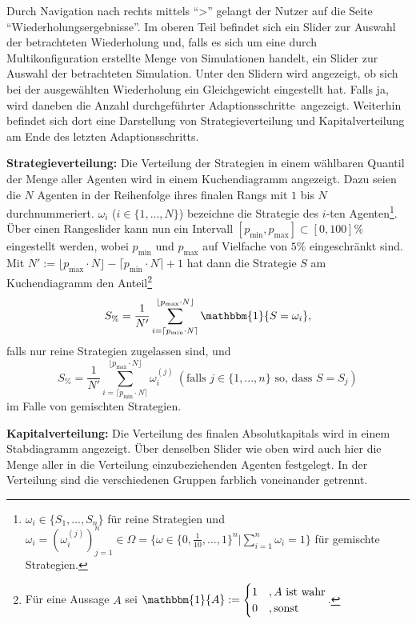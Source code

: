 \documentclass[parskip=full,11pt]{scrartcl}
\def\adapt{Adaptionsschritt}
\def\adapts{Adaptionsschritte}
\begin{document}
Durch Navigation nach rechts mittels \enquote{>} gelangt der Nutzer auf die Seite \enquote{Wiederholungsergebnisse}. Im oberen Teil befindet sich ein Slider zur Auswahl der betrachteten Wiederholung und, falls es sich um eine durch Multikonfiguration erstellte Menge von Simulationen handelt, ein Slider zur Auswahl der betrachteten Simulation. Unter den Slidern wird angezeigt, ob sich bei der ausgewählten Wiederholung ein Gleichgewicht eingestellt hat. Falls ja, wird daneben die Anzahl durchgeführter \adapts\ angezeigt. Weiterhin befindet sich dort eine Darstellung von Strategieverteilung und Kapitalverteilung am Ende des letzten \adapt s.

\textbf{Strategieverteilung:}
Die Verteilung der Strategien in einem wählbaren Quantil der Menge aller Agenten wird in einem Kuchendiagramm angezeigt. Dazu seien die \(N\) Agenten in der Reihenfolge ihres finalen Rangs mit \(1\) bis \(N\) durchnummeriert. \(\omega_i\) (\(i \in \{1,...,N\}\)) bezeichne die Strategie des \(i\)-ten Agenten\footnote{\(\omega_i \in \{S_1,...,S_n\}\) für reine Strategien und \(\omega_i = (\omega_i^{(j)})_{j=1}^n \in \Omega = \{\omega \in \{0,\frac{1}{10},...,1\}^n | \sum_{i=1}^n \omega_i = 1\}\) für gemischte Strategien.}. Über einen Rangeslider kann nun ein Intervall \([p_\text{min},p_\text{max}] \subset [0,100]\%\) eingestellt werden, wobei \(p_\text{min}\) und \(p_\text{max}\) auf Vielfache von \(5\%\) eingeschränkt sind. Mit \(N' := \lfloor p_\text{max} \cdot N \rfloor - \lceil p_\text{min} \cdot N \rceil + 1\) hat dann die Strategie \(S\) am Kuchendiagramm den Anteil\footnote{Für eine Aussage \(A\) sei \(\mathbbm{1}\{A\} := \begin{cases} 1 & , A \text{ ist wahr} \\ 0 &, \text{sonst}\end{cases}\).}
\[
S_\% = \frac{1}{N'} \sum_{i=\lceil p_\text{min} \cdot N \rceil}^{\lfloor p_\text{max} \cdot N \rfloor} \mathbbm{1}\{S = \omega_i\},
\]
falls nur reine Strategien zugelassen sind, und
\[
S_\% = \frac{1}{N'} \sum_{i=\lceil p_\text{min} \cdot N \rceil}^{\lfloor p_\text{max} \cdot N \rfloor} \omega_i^{(j)}  \ (\text{falls } j \in \{1,...,n\} \text{ so, dass } S = S_j)
\]
im Falle von gemischten Strategien.

\textbf{Kapitalverteilung:}
Die Verteilung des finalen Absolutkapitals wird in einem Stabdiagramm angezeigt. Über denselben Slider wie oben wird auch hier die Menge aller in die Verteilung einzubeziehenden Agenten festgelegt. In der Verteilung sind die verschiedenen Gruppen farblich voneinander getrennt.
\end{document}
